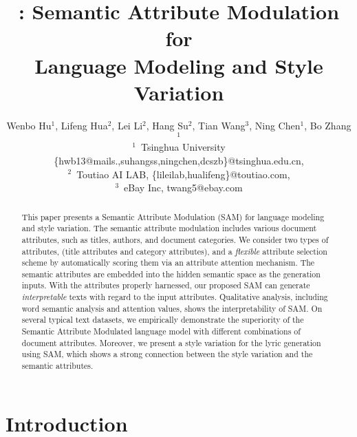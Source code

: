 \documentclass[a4paper]{article}
\title{\method: Semantic Attribute Modulation for \\Language Modeling and Style Variation}
\author{Wenbo Hu$^1$, Lifeng Hua$^2$, Lei Li$^2$, Hang Su$^2$, Tian Wang$^3$, Ning Chen$^1$, Bo Zhang$^1$\\
$^1$~Tsinghua University\\ 
\{hwb13@mails.,suhangss,ningchen,dcszb\}@tsinghua.edu.cn,\\
$^2$~Toutiao AI LAB, \{lileilab,hualifeng\}@toutiao.com,\\
$^3$~eBay Inc, twang5@ebay.com}
\newcommand{\method}{\xspace{SAM}}
\begin{document}
\maketitle

\begin{abstract}
This paper presents a Semantic Attribute Modulation (SAM) for language modeling and style variation. The semantic attribute modulation includes various document attributes, such as titles, authors, and document categories.
We consider two types of attributes, (title attributes and category attributes), and a \emph{flexible} attribute selection scheme by automatically scoring them via an attribute attention mechanism. %
The semantic attributes are embedded into the hidden semantic space as the generation inputs.
With the attributes properly harnessed, our proposed SAM can generate \emph{interpretable} texts with regard to the input attributes. %
Qualitative analysis, including word semantic analysis and attention values, shows the interpretability of \method. On several typical text datasets, we empirically demonstrate the superiority of the Semantic Attribute Modulated language model with different combinations of document attributes.
Moreover, we present a style variation for the lyric generation using \method, which shows a strong connection between the style variation and the semantic attributes.
\end{abstract}

\section{Introduction}\label{sec:introduction}
\end{document}
